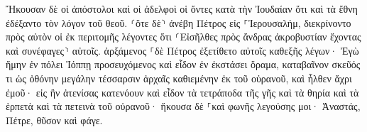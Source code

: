 \documentclass{openreader}
\begin{document}
Ἤκουσαν δὲ οἱ ἀπόστολοι καὶ οἱ ἀδελφοὶ οἱ ὄντες κατὰ τὴν Ἰουδαίαν ὅτι καὶ τὰ ἔθνη ἐδέξαντο τὸν λόγον τοῦ θεοῦ. 
⸂ὅτε δὲ⸃ ἀνέβη Πέτρος εἰς ⸀Ἰερουσαλήμ, διεκρίνοντο πρὸς αὐτὸν οἱ ἐκ περιτομῆς 
λέγοντες ὅτι ⸂Εἰσῆλθες πρὸς ἄνδρας ἀκροβυστίαν ἔχοντας καὶ συνέφαγες⸃ αὐτοῖς. 
ἀρξάμενος ⸀δὲ Πέτρος ἐξετίθετο αὐτοῖς καθεξῆς λέγων· 
Ἐγὼ ἤμην ἐν πόλει Ἰόππῃ προσευχόμενος καὶ εἶδον ἐν ἐκστάσει ὅραμα, καταβαῖνον σκεῦός τι ὡς ὀθόνην μεγάλην τέσσαρσιν ἀρχαῖς καθιεμένην ἐκ τοῦ οὐρανοῦ, καὶ ἦλθεν ἄχρι ἐμοῦ· 
εἰς ἣν ἀτενίσας κατενόουν καὶ εἶδον τὰ τετράποδα τῆς γῆς καὶ τὰ θηρία καὶ τὰ ἑρπετὰ καὶ τὰ πετεινὰ τοῦ οὐρανοῦ· 
ἤκουσα δὲ ⸀καὶ φωνῆς λεγούσης μοι· Ἀναστάς, Πέτρε, θῦσον καὶ φάγε. 
\end{document}
